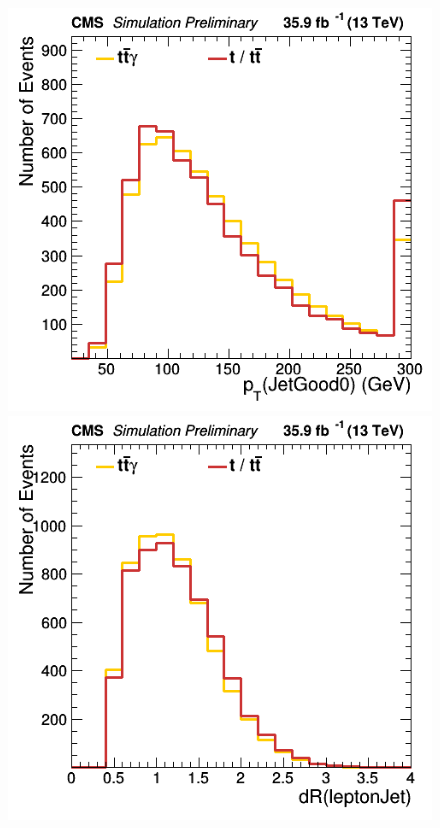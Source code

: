 \documentclass[11pt]{scrartcl}
\begin{document}
	\begin{figure}[H]
	\centering
	\begin{minipage}{.5\textwidth}
	  \centering
	  \includegraphics[width=0.70\linewidth]{figures/Select1/JetGood0_pt.png}
	\end{minipage}%
	\begin{minipage}{.5\textwidth}
	  \centering
	  \includegraphics[width=0.70\linewidth]{figures/Select1/leptonJetdR.png}
	\end{minipage}
	\end{figure}
	
\end{document}
